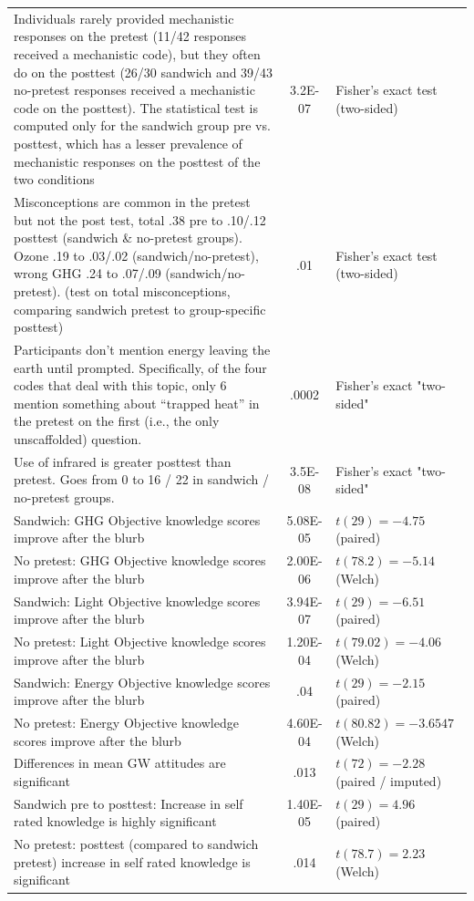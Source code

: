 \begin{longtabu}{X[2.5]S[table-parse-only]X[l]}
Individuals rarely provided mechanistic responses on the pretest 
(11/42 responses received a mechanistic code), but they often do on the
posttest (26/30 sandwich and 39/43 no-pretest responses received a mechanistic
code on the posttest). The statistical test is computed only for the sandwich group pre vs.
posttest, which has a lesser prevalence of mechanistic responses on the posttest
of the two conditions &	3.2E-07	&
Fisher's exact test (two-sided)	\\
Misconceptions are common in the pretest but not the post test, total .38 pre
to .10/.12 posttest (sandwich \& no-pretest groups). Ozone .19 to .03/.02
(sandwich/no-pretest),  wrong
GHG  .24 to .07/.09 (sandwich/no-pretest). (test on total misconceptions, comparing sandwich
pretest to group-specific posttest)	&	.01	&	Fisher's exact test (two-sided)	\\
Participants don't mention energy leaving the earth until prompted.
Specifically, of the four codes that deal with this topic, only 6 mention
something about “trapped heat” in the pretest on the first (i.e., the only
unscaffolded) question.	&	.0002	&	Fisher's exact "two-sided"	\\
Use of infrared is greater posttest than pretest. Goes from 0 to 16 / 22 in
sandwich
/ no-pretest groups.	&	3.5E-08	&	Fisher's exact "two-sided"	\\
Sandwich: GHG Objective knowledge scores improve after the blurb	&	5.08E-05
&	$t(29) = -4.75$ (paired)	\\
No pretest: GHG Objective knowledge scores improve after the blurb	&	2.00E-06
&	$t(78.2) = -5.14$ (Welch)	\\
Sandwich: Light Objective knowledge scores improve after the blurb	&	3.94E-07
&	$t(29) = -6.51$ (paired)	\\
No pretest: Light Objective knowledge scores improve after the blurb	&	1.20E-04
&	$t(79.02) = -4.06$ (Welch)	\\
Sandwich: Energy Objective knowledge scores improve after the blurb	&	.04
&	$t(29) = -2.15$ (paired)	\\
No pretest: Energy Objective knowledge scores improve after the blurb	&
4.60E-04	&	$t(80.82) = -3.6547$ (Welch)	\\
Differences in mean GW attitudes are significant	&	.013	&	$t(72) = -2.28$
(paired / imputed)	\\
Sandwich pre to posttest: Increase in self rated knowledge is highly
significant	&	1.40E-05	&	$t(29) = 4.96$ (paired)	\\
No pretest: posttest (compared to sandwich pretest) increase in self rated knowledge
is significant	&	.014	&	$t(78.7) = 2.23$ (Welch)	\\
					
\end{longtabu}


